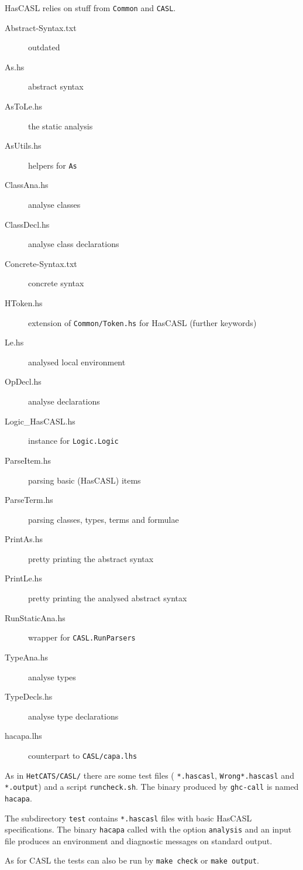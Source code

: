 \documentclass{article}
\begin{document}
HasCASL relies on stuff from \texttt{Common} and \texttt{CASL}.

\begin{description}
\item[Abstract-Syntax.txt] outdated
\item[As.hs] abstract syntax
\item[AsToLe.hs] the static analysis
\item[AsUtils.hs] helpers for \texttt{As}
\item[ClassAna.hs] analyse classes
\item[ClassDecl.hs] analyse class declarations
\item[Concrete-Syntax.txt] concrete syntax
\item[HToken.hs] extension of \texttt{Common/Token.hs} for HasCASL
  (further keywords)
\item[Le.hs] analysed local environment
\item[OpDecl.hs] analyse declarations
\item[Logic\_HasCASL.hs] instance for \texttt{Logic.Logic}
\item[ParseItem.hs] parsing basic (HasCASL) items
\item[ParseTerm.hs] parsing classes, types, terms and formulae
\item[PrintAs.hs] pretty printing the abstract syntax
\item[PrintLe.hs] pretty printing the analysed abstract syntax
\item[RunStaticAna.hs] wrapper for \texttt{CASL.RunParsers}
\item[TypeAna.hs] analyse types
\item[TypeDecls.hs] analyse type declarations
\item[hacapa.lhs] counterpart to \texttt{CASL/capa.lhs} 
\end{description}

As in \texttt{HetCATS/CASL/} there are some test files (
\texttt{*.hascasl}, \texttt{Wrong*.hascasl} and \texttt{*.output}) and a
script \texttt{runcheck.sh}. The binary produced by \texttt{ghc-call}
is named \texttt{hacapa}.

The subdirectory \texttt{test} contains \texttt{*.hascasl} files with basic
HasCASL specifications. The binary \texttt{hacapa} called with the option
\texttt{analysis} and an input file produces an environment and diagnostic
messages on standard output. 

As for CASL the tests can also be run by \texttt{make check} or 
\texttt{make output}.
\end{document}
